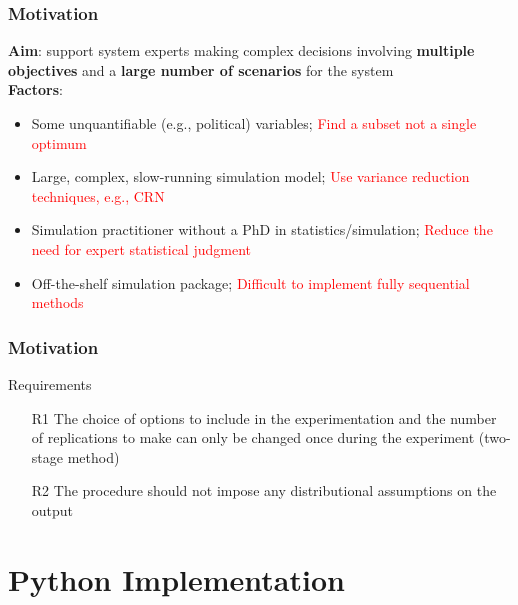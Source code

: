 \documentclass[aspectratio=169]{beamer}
\begin{document}

\begin{frame}
\frametitle{Motivation}
\textbf{Aim}: support system experts making complex decisions involving \textbf{multiple objectives} and a \textbf{large number of scenarios} for the system\\
\textbf{Factors}:
\begin{itemize}
\item Some unquantifiable (e.g., political) variables;   \textcolor{red}{Find a subset not a single optimum}
\item Large, complex, slow-running simulation model;  \textcolor{red}{Use variance reduction techniques, e.g., CRN}
\item Simulation practitioner without a PhD in statistics/simulation; \textcolor{red}{Reduce the need for expert statistical judgment}
\item Off-the-shelf simulation package;  \textcolor{red}{Difficult to implement fully sequential methods}
\end{itemize}
\end{frame}




\begin{frame}
\frametitle{Motivation}
\begin{block}{Requirements}
\begin{itemize}
\item[R1] The choice of options to include in the experimentation and the number of replications to make can only be changed once during the experiment (two-stage method)
\item[R2]The procedure should not impose any distributional assumptions on the output

\end{itemize}
\end{block}

\end{frame}







\section{Python Implementation}
\end{document}
